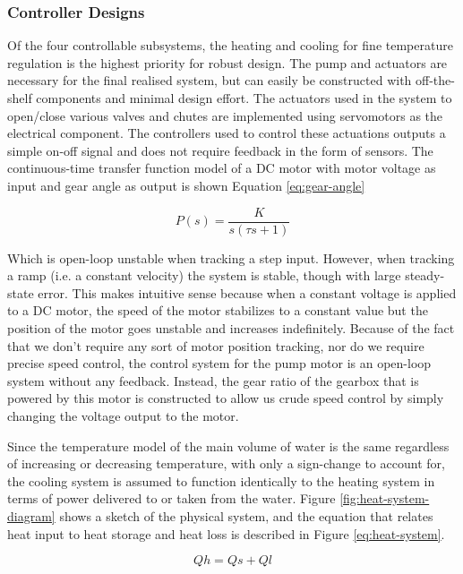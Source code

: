 \documentclass{article}
\begin{document}
\subsubsection{Controller Designs}\label{sec:controller-design}
Of the four controllable subsystems, the heating and cooling for fine temperature regulation is the highest priority for robust design. The pump and actuators are necessary for the final realised system, but can easily be constructed with off-the-shelf components and minimal design effort.
\noindent The actuators used in the system to open/close various valves and chutes are implemented using servomotors as the electrical component. The controllers used to control these actuations outputs a simple on-off signal and does not require feedback in the form of sensors.
\noindent The continuous-time transfer function model of a DC motor with motor voltage as input and gear angle as output is shown Equation \ref{eq:gear-angle}

\begin{equation}
P(s) = \frac{K}{s(\tau s + 1)}
\label{eq:gear-angle}
\end{equation}

\noindent Which is open-loop unstable when tracking a step input. However, when tracking a ramp (i.e. a constant velocity) the system is stable, though with large steady-state error. This makes intuitive sense because when a constant voltage is applied to a DC motor, the speed of the motor stabilizes to a constant value but the position of the motor goes unstable and increases indefinitely. Because of the fact that we don't require any sort of motor position tracking, nor do we require precise speed control, the control system for the pump motor is an open-loop system without any feedback. Instead, the gear ratio of the gearbox that is powered by this motor is constructed to allow us crude speed control by simply changing the voltage output to the motor.

\noindent Since the temperature model of the main volume of water is the same regardless of increasing or decreasing temperature, with only a sign-change to account for, the cooling system is assumed to function identically to the heating system in terms of power delivered to or taken from the water. Figure \ref{fig:heat-system-diagram} shows a sketch of the physical system, and the equation that relates heat input to heat storage and heat loss is described in Figure \ref{eq:heat-system}.

\begin{equation}
Qh = Qs + Ql
\label{eq:heat-system}
\end{equation}
\end{document}
